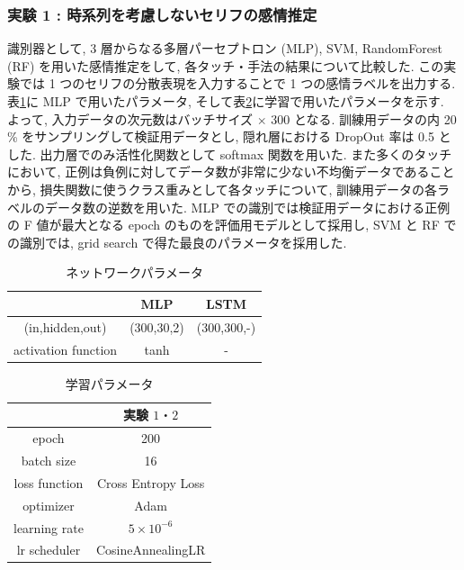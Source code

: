 \documentclass[twocolumn]{jarticle}     %
\begin{document}
\subsubsection{\small{実験 1 : 時系列を考慮しないセリフの感情推定}}
識別器として, 3 層からなる多層パーセプトロン (MLP), SVM, RandomForest (RF) を用いた感情推定をして, 各タッチ・手法の結果について比較した. この実験では 1 つのセリフの分散表現を入力することで 1 つの感情ラベルを出力する.
表\ref{table:net_para}に MLP で用いたパラメータ, そして表\ref{table:ex_para}に学習で用いたパラメータを示す. よって, 入力データの次元数はバッチサイズ $\times$ 300 となる.
訓練用データの内 20 \% をサンプリングして検証用データとし,
隠れ層における DropOut 率は 0.5 とした. 出力層でのみ活性化関数として softmax 関数を用いた. また多くのタッチにおいて, 正例は負例に対してデータ数が非常に少ない不均衡データであることから, 損失関数に使うクラス重みとして各タッチについて, 訓練用データの各ラベルのデータ数の逆数を用いた. MLP での識別では検証用データにおける正例の F 値が最大となる epoch のものを評価用モデルとして採用し, SVM と RF での識別では, grid search で得た最良のパラメータを採用した.


\begin{table}
\caption{ネットワークパラメータ}
\label{table:net_para}
\centering
\begin{tabular}{|c||c|c|}
\hline
& MLP & LSTM \\ \hline
(in,hidden,out) & (300,30,2) & (300,300,-)\\ \hline
activation function & tanh & -\\ \hline
\end{tabular}
\end{table}

\begin{table}
\caption{学習パラメータ}
\label{table:ex_para}
\centering
\begin{tabular}{|c||c|c|}
\hline
& \multicolumn{2}{|c|}{実験 $1・2$} \\ \hline
epoch & \multicolumn{2}{|c|}{200}  \\ \hline
batch size & \multicolumn{2}{|c|}{16} \\ \hline
loss function & \multicolumn{2}{|c|}{Cross Entropy Loss} \\ \hline
optimizer & \multicolumn{2}{|c|}{Adam} \\ \hline
learning rate & \multicolumn{2}{|c|}{$5 \times 10^{-6}$} \\ \hline
lr scheduler & \multicolumn{2}{|c|}{CosineAnnealingLR} \\ \hline
\end{tabular}
\end{table}
\end{document}
